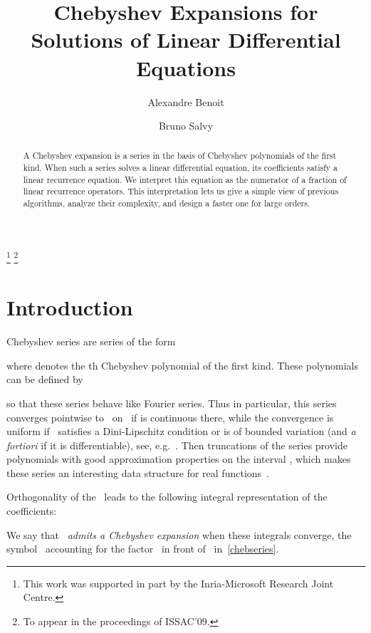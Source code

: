 \documentclass{amsart}
\theoremstyle{definition}
\begin{document}
\title{Chebyshev Expansions for\\ Solutions of Linear Differential Equations}

\address{Algorithms Project, Inria Paris-Rocquencourt}
\author{Alexandre Benoit}
\author{Bruno Salvy}




\thanks{This work was supported in part by the Inria-Microsoft Research Joint Centre.}
\thanks{To appear in the proceedings of ISSAC'09.}
       
\begin{abstract}
A Chebyshev expansion is a series in the basis of Chebyshev polynomials of the first kind. When such a series solves a linear differential equation, its coefficients satisfy a linear recurrence equation. We interpret this equation as the numerator of a fraction of linear recurrence operators. This interpretation lets us give a simple view of previous algorithms, analyze their complexity, and design a faster one for large orders.
\end{abstract}

\maketitle


\section{Introduction}
Chebyshev series are series of the form

where  denotes the th Chebyshev polynomial of the first kind. These polynomials can be defined by

so that these series behave like Fourier series. Thus in particular, this series converges pointwise to~ on~ if  is continuous there, while the convergence is uniform if~ satisfies a Dini-Lipschitz condition or is of bounded variation (and \emph{a fortiori} if it is differentiable), see, e.g.~\cite{GilSeguraTemme2007a,MasonHandscomb2003}.
Then truncations of the series provide polynomials with good approximation properties on the interval , which makes these series an interesting data structure for real functions~\cite{Trefethen2007}. 

Orthogonality of the~ leads to the following integral representation of the coefficients:

We say that~ \emph{admits a Chebyshev expansion}  when these integrals converge, the symbol~ accounting for the factor~ in front of~ in~\eqref{chebseries}.
\end{document}
